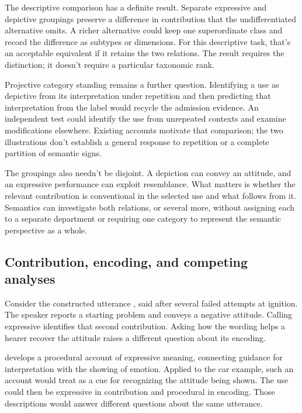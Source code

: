 \documentclass[12pt]{article}
\begin{document}
The descriptive comparison has a definite result. Separate expressive
and depictive groupings preserve a difference in contribution that the
undifferentiated alternative omits. A richer alternative could keep one
superordinate class and record the difference as subtypes or dimensions.
For this descriptive task, that's an acceptable equivalent if it retains
the two relations. The result requires the distinction; it doesn't require
a particular taxonomic rank.

Projective category standing remains a further question. Identifying a use
as depictive from its interpretation under repetition and then predicting
that interpretation from the label would recycle the admission evidence.
An independent test could identify the use from unrepeated contexts and
examine modifications elsewhere. Existing accounts motivate that comparison;
the two illustrations don't establish a general response to repetition or
a complete partition of semantic signs.

The groupings also needn't be disjoint. A depiction can convey an attitude,
and an expressive performance can exploit resemblance. What matters is
whether the relevant contribution is conventional in the selected use and
what follows from it. Semantics can investigate both relations, or several
more, without assigning each to a separate department or requiring one
category to represent the semantic perspective as a whole.

\subsection{Contribution, encoding, and competing analyses}\label{sec:encoding}

Consider the constructed utterance ,
said after several failed attempts at ignition. The speaker reports a
starting problem and conveys a negative attitude. Calling 
expressive identifies that second contribution. Asking how the wording
helps a hearer recover the attitude raises a different question about
its encoding.

\textcite{wharton2016expressives} develops a procedural account of expressive
meaning, connecting guidance for interpretation with the showing of emotion.
Applied to the car example, such an account would treat 
as a cue for recognizing the attitude being shown. The use could then
be expressive in contribution and procedural in encoding. Those descriptions
would answer different questions about the same utterance.
\end{document}
